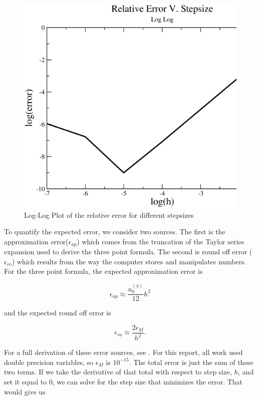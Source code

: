 \documentclass[%
oneside,                 %
final,                   %
10pt]{article}
\begin{document}
\begin{figure}[H]
\label{fig:error}
  \centering
    \includegraphics[width=1.2\textwidth]{RelativeError.eps}
    \caption{Log-Log Plot of the relative error for different stepsizes}
\end{figure}

To quantify the expected error, we consider two sources.  The first is the approximation error($\epsilon_{ap}$) which comes from the truncation of the Taylor series expansion used to derive the three point formula.  The second is round off error ($\epsilon_{ro}$) which results from the way the computer stores and manipulates numbers.  For the three point formula, the expected approximation error is 

\begin{equation*}
\epsilon_{ap}\approx \frac{u_0^{(4)}}{12}h^2
\end{equation*}

and the expected round off error is

\begin{equation*}
\epsilon_{ro}\approx \frac{2 \epsilon_M}{h^2}.
\end{equation*}

For a full derivation of these error sources, see \cite{ClassNotes}.  For this report, all work used double precision variables, so $\epsilon_M$ is $10^{-15}$.  The total error is just the sum of these two terms.  If we take the derivative of that total with respect to step size, $h$, and set it equal to 0, we can solve for the step size that minimizes the error.  That would give us 
\end{document}
